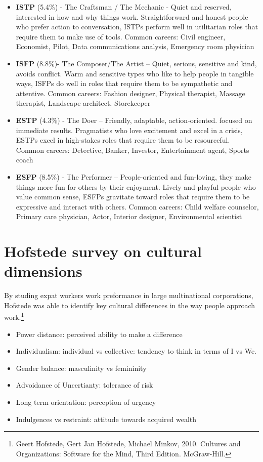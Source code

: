 \documentclass[]{book}
\providecommand{\tightlist}{%
  \setlength{\itemsep}{0pt}\setlength{\parskip}{0pt}}
\let\rmarkdownfootnote\footnote%
\def\footnote{\protect\rmarkdownfootnote}
\begin{document}
\begin{itemize}
\item
  \textbf{ISTP} (5.4\%) - The Craftsman / The Mechanic - Quiet and reserved, interested in how and why things work. Straightforward and honest people who prefer action to conversation, ISTPs perform well in utilitarian roles that require them to make use of tools. Common careers: Civil engineer, Economist, Pilot, Data communications analysis, Emergency room physician
\item
  \textbf{ISFP} (8.8\%)- The Composer/The Artist -- Quiet, serious, sensitive and kind, avoids conflict. Warm and sensitive types who like to help people in tangible ways, ISFPs do well in roles that require them to be sympathetic and attentive. Common careers: Fashion designer, Physical therapist, Massage therapist, Landscape architect, Storekeeper
\item
  \textbf{ESTP} (4.3\%) - The Doer -- Friendly, adaptable, action-oriented. focused on immediate results. Pragmatists who love excitement and excel in a crisis, ESTPs excel in high-stakes roles that require them to be resourceful. Common careers: Detective, Banker, Investor, Entertainment agent, Sports coach
\item
  \textbf{ESFP} (8.5\%) - The Performer -- People-oriented and fun-loving, they make things more fun for others by their enjoyment. Lively and playful people who value common sense, ESFPs gravitate toward roles that require them to be expressive and interact with others. Common careers: Child welfare counselor, Primary care physician, Actor, Interior designer, Environmental scientist
\end{itemize}

\hypertarget{hofstede-survey-on-cultural-dimensions}{%
\section{Hofstede survey on cultural dimensions}\label{hofstede-survey-on-cultural-dimensions}}

By studing expat workers work preformance in large multinational corporations, Hofstede was able to identify key cultural differences in the way people approach work.\footnote{Geert Hofstede, Gert Jan Hofstede, Michael Minkov, 2010. Cultures and Organizations: Software for the Mind, Third Edition. McGraw-Hill.}

\begin{itemize}
\tightlist
\item
  Power distance: perceived ability to make a difference
\item
  Individualism: individual vs collective: tendency to think in terms of I vs We.
\item
  Gender balance: masculinity vs femininity
\item
  Advoidance of Uncertianty: tolerance of risk
\item
  Long term orientation: perception of urgency\\
\item
  Indulgences vs restraint: attitude towards acquired wealth
\end{itemize}
\end{document}
